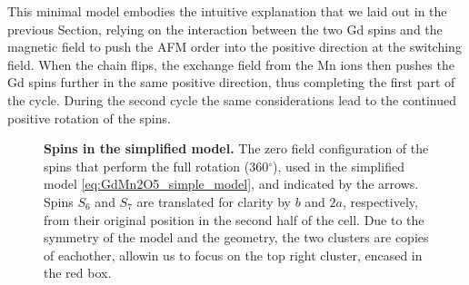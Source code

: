 This minimal model embodies the intuitive explanation that we laid out in the previous Section, relying on the interaction between the two Gd spins and the magnetic field to push the AFM order into the positive direction at the switching field.
When the chain flips, the exchange field from the Mn ions then pushes the Gd spins further in the same positive direction, thus completing the first part of the cycle.
During the second cycle the same considerations lead to the continued positive rotation of the spins.


\begin{figure}[b]
	\caption{\label{fig:GdMn2O5_simple_model}{\bf Spins in the simplified model.} The zero field configuration of the spins that perform the full rotation (360$^\circ$), used in the simplified model \eqref{eq:GdMn2O5_simple_model}, and indicated by the arrows. Spins $S_6$ and $S_7$ are translated for clarity by $b$ and $2a$, respectively, from their original position in the second half of the cell. Due to the symmetry of the model and the geometry, the two clusters are copies of eachother, allowin us to focus on the top right cluster, encased in the red box.}
\end{figure}


